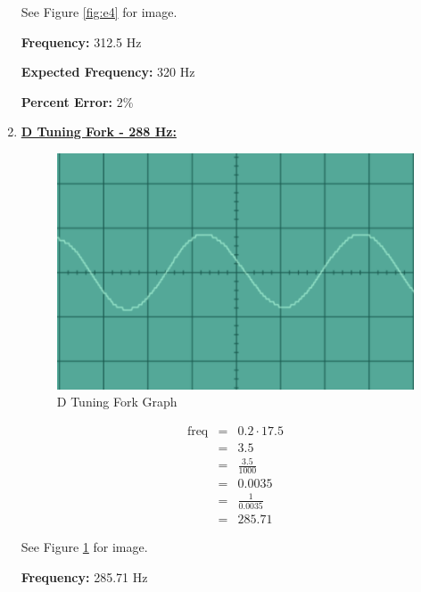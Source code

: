 \documentclass[12pt,oneside]{article}
\begin{document}
\begin{enumerate}
See Figure \ref{fig:e4} for image.

\textbf{Frequency:} 312.5 Hz

\par

\textbf{Expected Frequency:} 320 Hz

\par

\textbf{Percent Error: } 2\%

\color{black}
\item \underline{\bf D Tuning Fork - 288 Hz:}
\color{red}

\begin{figure}[H]

{\centering \includegraphics[width=15cm,]{./images/d4} 

}

\caption{D Tuning Fork Graph}\label{fig:d4}
\end{figure}

\begin{eqnarray}
  \text{freq} & = & 0.2 \cdot 17.5 \\
              & = & 3.5 \\
              & = & \frac{3.5}{1000} \\
              & = & 0.0035 \\
              & = & \frac{1}{0.0035} \\
              & = & 285.71
\end{eqnarray}

See Figure \ref{fig:d4} for image.

\textbf{Frequency:} 285.71 Hz

\par


\end{enumerate}
\end{document}
